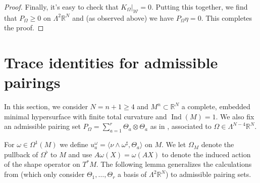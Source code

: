 \documentclass[11pt]{amsart}
\numberwithin{equation}{section}
\theoremstyle{plain}
\theoremstyle{definition}
\theoremstyle{remark}
\newcommand{\R}{\mathbb{R}}
\DeclareMathOperator{\Ind}{Ind}
\newcommand{\Wcal}{\mathcal W}
\newcommand{\bangle}[1]{\langle #1 \rangle}
\begin{document}
\begin{proof}
Finally, it's easy to check that $K_\Omega|_{\Wcal} = 0$. Putting this together, we find that $P_\Omega \geq 0$ on $\Lambda^2 \R^N$ and (as observed above) we have $P_\Omega \eta = 0$. This completes the proof.
\end{proof}

\section{Trace identities for admissible pairings} \label{sec:trace}

In this section, we consider $N = n+1\geq 4$ and $M^n\subset \R^N$ a complete, embedded minimal hypersurface with finite total curvature and $\Ind(M) = 1$. We also fix an admissible pairing set $P_\Omega = \sum_{a=1}^r \Theta_a \otimes \Theta_a$ as in , associated to $\Omega \in \Lambda^{N-4}\R^N$. 

For $\omega \in \Omega^1(M)$ we define $u^\omega_{a} = \bangle{\nu  \wedge \omega^\sharp ,\Theta_a}$ on $M$. We let $\Omega_M$ denote the pullback of $\Omega^\flat$ to $M$ and use $A\omega(X) = \omega(AX)$ to denote the induced action of the shape operator on $T^*M$.  The following lemma generalizes the calculations from \cite{Savo2010,AmbrozioCarlottoSharp2018,Li2017} (which only consider $\Theta_1,\dots,\Theta_r$ a basis of $\Lambda^2\R^N$) to admissible pairing sets. 
\end{document}
